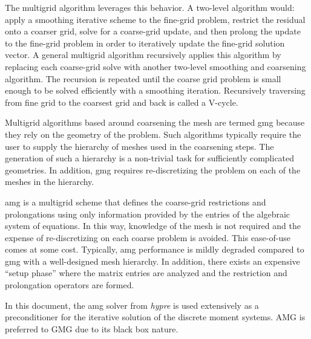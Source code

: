 \documentclass[../doc.tex]{subfiles}
\begin{document}
The multigrid algorithm leverages this behavior. A two-level algorithm would: apply a smoothing iterative scheme to the fine-grid problem, restrict the residual onto a coarser grid, solve for a coarse-grid update, and then prolong the update to the fine-grid problem in order to iteratively update the fine-grid solution vector. A general multigrid algorithm recursively applies this algorithm by replacing each coarse-grid solve with another two-level smoothing and coarsening algorithm. The recursion is repeated until the coarse grid problem is small enough to be solved efficiently with a smoothing iteration. Recursively traversing from fine grid to the coarsest grid and back is called a V-cycle. 

Multigrid algorithms based around coarsening the mesh are termed \gls{gmg} because they rely on the geometry of the problem. Such algorithms typically require the user to supply the hierarchy of meshes used in the coarsening steps. The generation of such a hierarchy is a non-trivial task for sufficiently complicated geometries. In addition, \gls{gmg} requires re-discretizing the problem on each of the meshes in the hierarchy. 

\gls{amg} \cite{amg} is a multigrid scheme that defines the coarse-grid restrictions and prolongations using only information provided by the entries of the algebraic system of equations. In this way, knowledge of the mesh is not required and the expense of re-discretizing on each coarse problem is avoided. This ease-of-use comes at some cost. Typically, \gls{amg} performance is mildly degraded compared to \gls{gmg} with a well-designed mesh hierarchy. In addition, there exists an expensive ``setup phase'' where the matrix entries are analyzed and the restriction and prolongation operators are formed. 

In this document, the \gls{amg} solver from \emph{hypre} \cite{hypre} is used extensively as a preconditioner for the iterative solution of the discrete moment systems. AMG is preferred to GMG due to its black box nature. 
\end{document}

